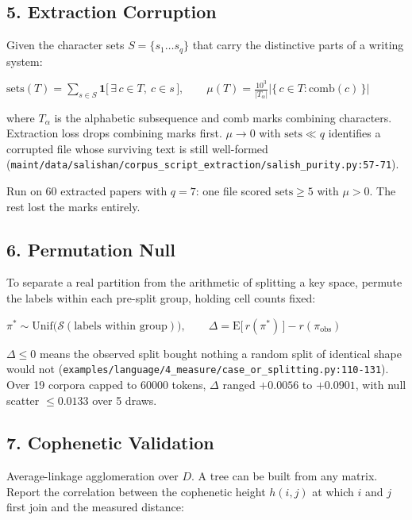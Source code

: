 \subsection{5. Extraction Corruption}

Given the character sets \(S = \{s_1 \dots s_q\}\) that carry the distinctive parts of a writing system:

\(\mathrm{sets}(T) = \sum_{s \in S} \mathbf{1}\bigl[\,\exists\, c \in T,\ c \in s\,\bigr], \qquad \mu(T) = \frac{10^3}{|T_\alpha|}\bigl|\{\,c \in T : \mathrm{comb}(c)\,\}\bigr|\)

where \(T_\alpha\) is the alphabetic subsequence and \(\mathrm{comb}\) marks combining characters. Extraction loss drops combining marks first. \(\mu \to 0\) with \(\mathrm{sets} \ll q\) identifies a corrupted file whose surviving text is still well-formed (\texttt{maint/\allowbreak{}data/\allowbreak{}salishan/\allowbreak{}corpus\_\allowbreak{}script\_\allowbreak{}extraction/\allowbreak{}salish\_\allowbreak{}purity.\allowbreak{}py:57-\allowbreak{}71}).

Run on 60 extracted papers with \(q=7\): one file scored \(\mathrm{sets} \ge 5\) with \(\mu > 0\). The rest lost the marks entirely.

\subsection{6. Permutation Null}

To separate a real partition from the arithmetic of splitting a key space, permute the labels within each pre-split group, holding cell counts fixed:

\(\pi^{\ast} \sim \mathrm{Unif}\bigl(\mathcal{S}(\text{labels within group})\bigr), \qquad \Delta = \mathrm{E}\bigl[\,r(\pi^{\ast})\,\bigr] - r(\pi_{\text{obs}})\)

\(\Delta \le 0\) means the observed split bought nothing a random split of identical shape would not (\texttt{examples/\allowbreak{}language/\allowbreak{}4\_\allowbreak{}measure/\allowbreak{}case\_\allowbreak{}or\_\allowbreak{}splitting.\allowbreak{}py:110-\allowbreak{}131}). Over 19 corpora capped to 60000 tokens, \(\Delta\) ranged \(+0.0056\) to \(+0.0901\), with null scatter \(\le 0.0133\) over 5 draws.

\subsection{7. Cophenetic Validation}

Average-linkage agglomeration over \(D\). A tree can be built from any matrix. Report the correlation between the cophenetic height \(h(i,j)\) at which \(i\) and \(j\) first join and the measured distance:

